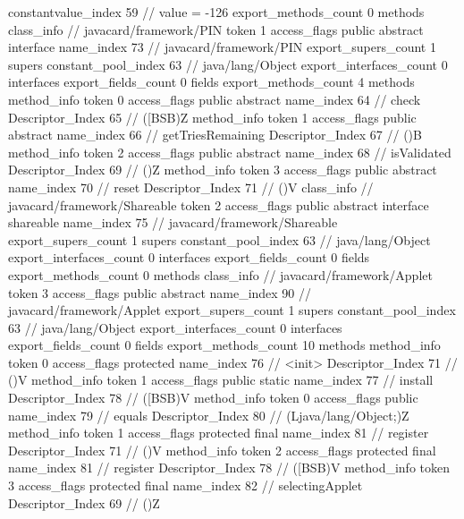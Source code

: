 {{{{{{{					constantvalue_index	59		// value = -126
				}
				}
			}
			}
			export_methods_count	0
			methods {
			}
		}
		class_info {		// javacard/framework/PIN
			token	1
			access_flags	public abstract interface
			name_index	73		// javacard/framework/PIN
			export_supers_count	1
			supers {
				constant_pool_index	63		// java/lang/Object
			}
			export_interfaces_count	0
			interfaces {
			}
			export_fields_count	0
			fields {
			}
			export_methods_count	4
			methods {
				method_info {
					token	0
					access_flags	public abstract
					name_index	64		// check
					Descriptor_Index	65		// ([BSB)Z
				}
				method_info {
					token	1
					access_flags	public abstract
					name_index	66		// getTriesRemaining
					Descriptor_Index	67		// ()B
				}
				method_info {
					token	2
					access_flags	public abstract
					name_index	68		// isValidated
					Descriptor_Index	69		// ()Z
				}
				method_info {
					token	3
					access_flags	public abstract
					name_index	70		// reset
					Descriptor_Index	71		// ()V
				}
			}
		}
		class_info {		// javacard/framework/Shareable
			token	2
			access_flags	public abstract interface shareable
			name_index	75		// javacard/framework/Shareable
			export_supers_count	1
			supers {
				constant_pool_index	63		// java/lang/Object
			}
			export_interfaces_count	0
			interfaces {
			}
			export_fields_count	0
			fields {
			}
			export_methods_count	0
			methods {
			}
		}
		class_info {		// javacard/framework/Applet
			token	3
			access_flags	public abstract
			name_index	90		// javacard/framework/Applet
			export_supers_count	1
			supers {
				constant_pool_index	63		// java/lang/Object
			}
			export_interfaces_count	0
			interfaces {
			}
			export_fields_count	0
			fields {
			}
			export_methods_count	10
			methods {
				method_info {
					token	0
					access_flags	protected
					name_index	76		// <init>
					Descriptor_Index	71		// ()V
				}
				method_info {
					token	1
					access_flags	public static
					name_index	77		// install
					Descriptor_Index	78		// ([BSB)V
				}
				method_info {
					token	0
					access_flags	public
					name_index	79		// equals
					Descriptor_Index	80		// (Ljava/lang/Object;)Z
				}
				method_info {
					token	1
					access_flags	protected final
					name_index	81		// register
					Descriptor_Index	71		// ()V
				}
				method_info {
					token	2
					access_flags	protected final
					name_index	81		// register
					Descriptor_Index	78		// ([BSB)V
				}
				method_info {
					token	3
					access_flags	protected final
					name_index	82		// selectingApplet
					Descriptor_Index	69		// ()Z
}}}}}
